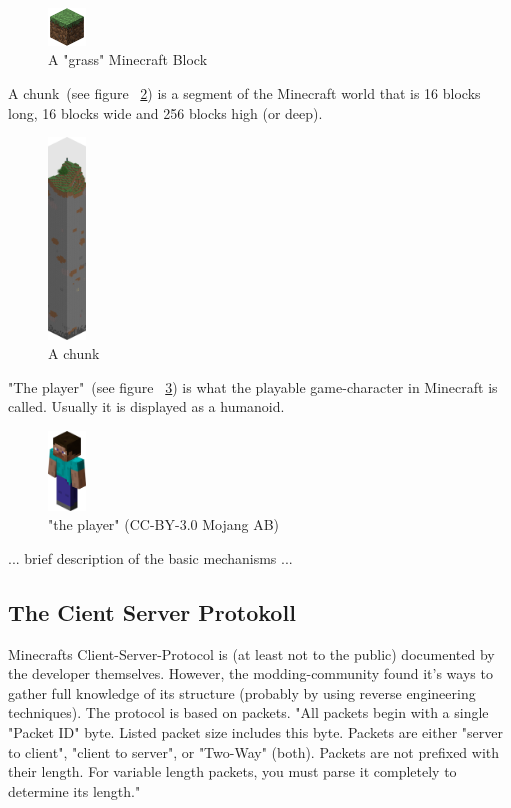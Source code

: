 \begin{figure}[h]
  \centering
    \includegraphics[width=1cm]{graphics/block}
  \caption{A "grass" Minecraft Block}
  \label{mc_block}
\end{figure}
        
A chunk~(see figure ~\ref{mc_chunk}) is a segment of the Minecraft world that is 16 blocks long, 16 blocks wide and 256 blocks high (or deep).~\cite{mcwiki_chunks}

\begin{figure}[h]
  \centering
    \includegraphics[width=1cm]{graphics/chunk}
  \caption{A chunk}
  \label{mc_chunk}
\end{figure}

"The player"~(see figure ~\ref{mc_player}) is what the playable game-character in Minecraft is called. Usually it is displayed as a humanoid.

\begin{figure}[h]
  \centering
    \includegraphics[width=1cm]{graphics/player}
  \caption{"the player" (CC-BY-3.0 Mojang AB) \cite{image_mob}}
  \label{mc_player}
\end{figure}

... brief description of the basic mechanisms ...

        \subsection{The Cient Server Protokoll}
Minecrafts Client-Server-Protocol is (at least not to the public) documented by the developer themselves. However, the modding-community found it's ways to gather full knowledge of its structure (probably by using reverse engineering techniques). The protocol is based on packets. "All packets begin with a single "Packet ID" byte. Listed packet size includes this byte. Packets are either "server to client", "client to server", or "Two-Way" (both). Packets are not prefixed with their length. For variable length packets, you must parse it completely to determine its length." 

